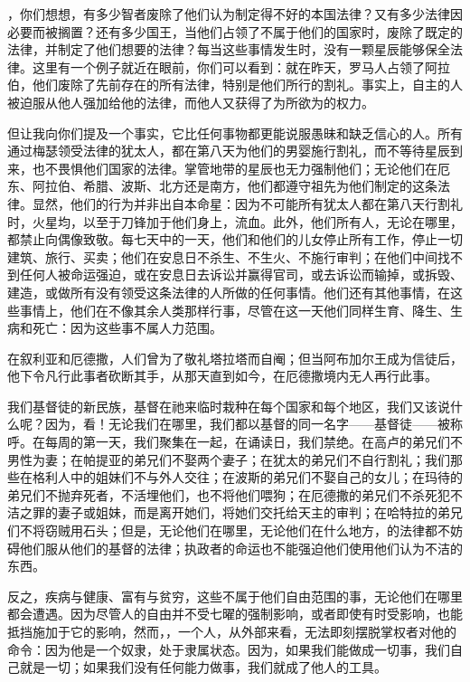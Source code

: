 ，你们想想，有多少智者废除了他们认为制定得不好的本国法律？又有多少法律因必要而被搁置？还有多少国王，当他们占领了不属于他们的国家时，废除了既定的法律，并制定了他们想要的法律？每当这些事情发生时，没有一颗星辰能够保全法律。这里有一个例子就近在眼前，你们可以看到：就在昨天，罗马人占领了阿拉伯，他们废除了先前存在的所有法律，特别是他们所行的割礼。事实上，自主的人被迫服从他人强加给他的法律，而他人又获得了为所欲为的权力。\par

但让我向你们提及一个事实，它比任何事物都更能说服愚昧和缺乏信心的人。所有通过梅瑟领受法律的犹太人，都在第八天为他们的男婴施行割礼，而不等待星辰到来，也不畏惧他们国家的法律。掌管地带的星辰也无力强制他们；无论他们在厄东、阿拉伯、希腊、波斯、北方还是南方，他们都遵守祖先为他们制定的这条法律。显然，他们的行为并非出自本命星：因为不可能所有犹太人都在第八天行割礼时，火星均，以至于刀锋加于他们身上，流血。此外，他们所有人，无论在哪里，都禁止向偶像致敬。每七天中的一天，他们和他们的儿女停止所有工作，停止一切建筑、旅行、买卖；他们在安息日不杀生、不生火、不施行审判；在他们中间找不到任何人被命运强迫，或在安息日去诉讼并赢得官司，或去诉讼而输掉，或拆毁、建造，或做所有没有领受这条法律的人所做的任何事情。他们还有其他事情，在这些事情上，他们在不像其余人类那样行事，尽管在这一天他们同样生育、降生、生病和死亡：因为这些事不属人力范围。\par

在叙利亚和厄德撒，人们曾为了敬礼塔拉塔而自阉；但当阿布加尔王成为信徒后，他下令凡行此事者砍断其手，从那天直到如今，在厄德撒境内无人再行此事。\par

我们基督徒的新民族，基督在祂来临时栽种在每个国家和每个地区，我们又该说什么呢？因为，看！无论我们在哪里，我们都以基督的同一名字——基督徒——被称呼。在每周的第一天，我们聚集在一起，在诵读日，我们禁绝。在高卢的弟兄们不男性为妻；在帕提亚的弟兄们不娶两个妻子；在犹太的弟兄们不自行割礼；我们那些在格利人中的姐妹们不与外人交往；在波斯的弟兄们不娶自己的女儿；在玛待的弟兄们不抛弃死者，不活埋他们，也不将他们喂狗；在厄德撒的弟兄们不杀死犯不洁之罪的妻子或姐妹，而是离开她们，将她们交托给天主的审判；在哈特拉的弟兄们不将窃贼用石头；但是，无论他们在哪里，无论他们在什么地方，的法律都不妨碍他们服从他们的基督的法律；执政者的命运也不能强迫他们使用他们认为不洁的东西。\par

反之，疾病与健康、富有与贫穷，这些不属于他们自由范围的事，无论他们在哪里都会遭遇。因为尽管人的自由并不受七曜的强制影响，或者即使有时受影响，也能抵挡施加于它的影响，然而，，一个人，从外部来看，无法即刻摆脱掌权者对他的命令：因为他是一个奴隶，处于隶属状态。因为，如果我们能做成一切事，我们自己就是一切；如果我们没有任何能力做事，我们就成了他人的工具。\par

